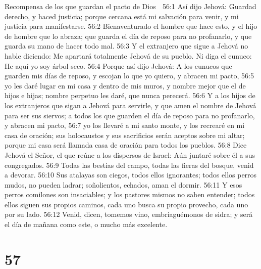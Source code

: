 Recompensa de los que guardan el pacto de Dios  

56:1 Así dijo Jehová: Guardad derecho, y haced justicia; porque cercana está mi salvación para venir, y mi justicia para manifestarse.  
56:2 Bienaventurado el hombre que hace esto, y el hijo de hombre que lo abraza; que guarda el día de reposo para no profanarlo, y que guarda su mano de hacer todo mal.  
56:3 Y el extranjero que sigue a Jehová no hable diciendo: Me apartará totalmente Jehová de su pueblo. Ni diga el eunuco: He aquí yo soy árbol seco.  
56:4 Porque así dijo Jehová: A los eunucos que guarden mis días de reposo, y escojan lo que yo quiero, y abracen mi pacto,  
56:5 yo les daré lugar en mi casa y dentro de mis muros, y nombre mejor que el de hijos e hijas; nombre perpetuo les daré, que nunca perecerá.  
56:6 Y a los hijos de los extranjeros que sigan a Jehová para servirle, y que amen el nombre de Jehová para ser sus siervos; a todos los que guarden el día de reposo para no profanarlo, y abracen mi pacto,  
56:7 yo los llevaré a mi santo monte, y los recrearé en mi casa de oración; sus holocaustos y sus sacrificios serán aceptos sobre mi altar; porque mi casa será llamada casa de oración para todos los pueblos. 
56:8 Dice Jehová el Señor, el que reúne a los dispersos de Israel: Aún juntaré sobre él a sus congregados.  
56:9 Todas las bestias del campo, todas las fieras del bosque, venid a devorar.  
56:10 Sus atalayas son ciegos, todos ellos ignorantes; todos ellos perros mudos, no pueden ladrar; soñolientos, echados, aman el dormir.  
56:11 Y esos perros comilones son insaciables; y los pastores mismos no saben entender; todos ellos siguen sus propios caminos, cada uno busca su propio provecho, cada uno por su lado.  
56:12 Venid, dicen, tomemos vino, embriaguémonos de sidra; y será el día de mañana como este, o mucho más excelente.  

\chapter{57}

